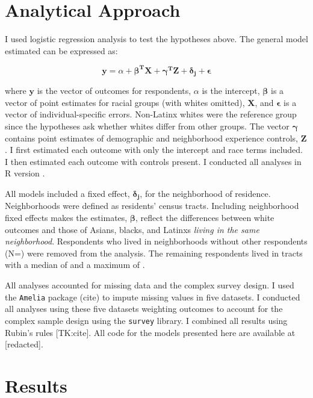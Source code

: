 \documentclass{baderart}
\begin{document}
\section{Analytical Approach}\label{analytical-approach}

I used logistic regression analysis to test the hypotheses above. The general model estimated can be expressed as:

\[\mathbf{y} = \alpha + \mathbf{\beta^T X} + \mathbf{\gamma^T Z} + \mathbf{\delta_j} + \mathbf{\epsilon}\]

\noindent where \(\mathbf{y}\) is the vector of outcomes for respondents, \(\alpha\) is the intercept, \(\mathbf{\beta}\) is a vector of point estimates for racial groups (with whites omitted), \(\mathbf{X}\), and \(\mathbf{\epsilon}\) is a vector of individual-specific errors. Non-Latinx whites were the reference group since the hypotheses ask whether whites differ from other groups. The vector \(\mathbf{\gamma}\) contains point estimates of demographic and neighborhood experience controls, \(\mathbf{Z}\). I first estimated each outcome with only the intercept and race terms included. I then estimated each outcome with controls present. I conducted all analyses in R version \Rversion.

All models included a fixed effect, \(\mathbf{\delta_j}\), for the neighborhood of residence. Neighborhoods were defined as residents' census tracts. Including neighborhood fixed effects makes the estimates, \(\mathbf{\beta}\), reflect the differences between white outcomes and those of Asians, blacks, and Latinxs \emph{living in the same neighborhood}. Respondents who lived in neighborhoods without other respondents (N=\oneresp) were removed from the analysis. The remaining respondents lived in tracts with a median of \medNpertract and a maximum of \maxNpertract.

All analyses accounted for missing data and the complex survey design. I used the \texttt{Amelia} package (cite) to impute missing values in five datasets. I conducted all analyses using these five datasets weighting outcomes to account for the complex sample design using the \texttt{survey} library. I combined all results using Rubin's rules {[}TK:cite{]}. All code for the models presented here are available at {[}redacted{]}.

\section{Results}\label{results}
\end{document}
